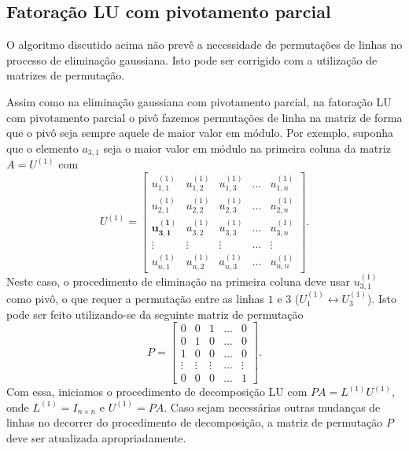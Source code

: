 \subsection{Fatoração LU com pivotamento parcial}

O algoritmo discutido acima não prevê a necessidade de permutações de linhas no processo de eliminação gaussiana. Isto pode ser corrigido com a utilização de matrizes de permutação.

Assim como na eliminação gaussiana com pivotamento parcial, na fatoração LU com pivotamento parcial o pivô fazemos permutações de linha na matriz de forma que o pivô seja sempre aquele de maior valor em módulo. Por exemplo, suponha que o elemento $a_{3,1}$ seja o maior valor em módulo na primeira coluna da matriz $A = U^{(1)}$ com
\begin{equation}
  U^{(1)} = \begin{bmatrix}
    u_{1,1}^{(1)} & u_{1,2}^{(1)} & u_{1,3}^{(1)} & \ldots & u_{1,n}^{(1)} \\
    u_{2,1}^{(1)} & u_{2,2}^{(1)} & u_{2,3}^{(1)} & \ldots & u_{2,n}^{(1)} \\
    \pmb{u_{3,1}^{(1)}} & u_{3,2}^{(1)} & u_{3,3}^{(1)} & \ldots & u_{3,n}^{(1)} \\
    \vdots & \vdots & \vdots & \ldots & \vdots \\
    u_{n,1}^{(1)} & u_{n,2}^{(1)} & a_{n,3}^{(1)} & \ldots & u_{n,n}^{(1)}
  \end{bmatrix}.
\end{equation}
Neste caso, o procedimento de eliminação na primeira coluna deve usar $u_{3,1}^{(1)}$ como pivô, o que requer a permutação entre as linhas $1$ e $3$ ($U_1^{(1)} \leftrightarrow U_3^{(1)}$). Isto pode ser feito utilizando-se da seguinte matriz de permutação
\begin{equation}
  P =
  \begin{bmatrix}
    0 & 0 & 1 & \ldots & 0\\
    0 & 1 & 0 & \ldots & 0\\
    1 & 0 & 0 & \ldots & 0\\
    \vdots & \vdots & \vdots & \ldots & \vdots\\
    0 & 0 & 0 & \ldots & 1
  \end{bmatrix}.
\end{equation}
Com essa, iniciamos o procedimento de decomposição LU com $PA = L^{(1)}U^{(1)}$, onde $L^{(1)} = I_{n\times n}$ e $U^{(1)} = PA$. Caso sejam necessárias outras mudanças de linhas no decorrer do procedimento de decomposição, a matriz de permutação $P$ deve ser atualizada apropriadamente.

